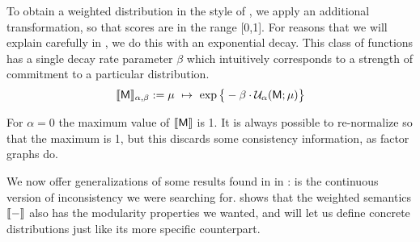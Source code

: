 \documentclass{article}
\newcommand{\sfM}{\mathsf M}
\numberwithin{equation}{section}
\begin{document}
	To obtain a weighted distribution in the style of \parencite{halpern2015weighted}, we apply an additional transformation, so that scores are in the range [0,1].
	For reasons that we will explain carefully in , we do this with an exponential decay. 
	This class of functions has a single decay rate parameter $\beta$ which intuitively corresponds to a strength of commitment to a particular distribution.
	\begin{equation}
		\bbr{\sfM}_{\alpha,\beta} := \mu~\mapsto~\exp \big\{ -\beta \cdot \mathcal U_\alpha(\sfM; \mu) \big\} \label{eqn:weighted-semantics}
	\end{equation}
	
	For $\alpha = 0$ the maximum value of $\bbr{\sfM}$ is 1. It is always possible to re-normalize so that the maximum is 1, but this discards some consistency information, as factor graphs do.
	


	We now offer generalizations of some results found in in :  is the continuous version of inconsistency we were searching for.  shows that the weighted semantics $\llbracket-\rrbracket$ also has the modularity properties we wanted, and  will let us define concrete distributions just like its more specific counterpart.
	
\end{document}
